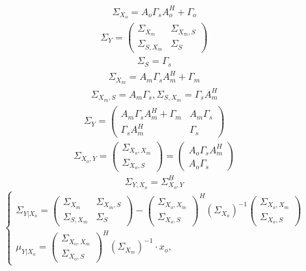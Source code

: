\documentclass[11pt]{article}
\begin{document}
\begin{gather}
\Sigma_{X_o}=A_o\Gamma_sA_o^H+\Gamma_o
\end{gather}
\begin{gather}
\Sigma_{Y} = \begin{pmatrix}
\Sigma_{X_m}&\Sigma_{X_m, S}\\
\Sigma_{S, X_m}&\Sigma_{S}
\end{pmatrix}
\end{gather}
\begin{gather}
\Sigma_{S} = \Gamma_s
\end{gather}
\begin{gather}
\Sigma_{X_m} = A_m \Gamma_s A_m^H + \Gamma_m
\end{gather}
\begin{gather}
\Sigma_{X_m,S} = A_m \Gamma_s, \Sigma_{S, X_m} = \Gamma_s A_m^H 
\end{gather}
\begin{gather}
\Sigma_{Y} = \begin{pmatrix}
A_m \Gamma_s A_m^H + \Gamma_m&A_m \Gamma_s\\
\Gamma_s A_m^H&\Gamma_s
\end{pmatrix}
\end{gather}
\begin{gather}
\Sigma_{X_o,Y}
= \begin{pmatrix}
\Sigma_{X_o,X_m}\\
\Sigma_{X_o,S}
\end{pmatrix}= 
\begin{pmatrix}
A_o\Gamma_s A_m^H\\
A_o\Gamma_s
\end{pmatrix}
\end{gather}
\begin{gather}
\Sigma_{Y,X_o}
= \Sigma_{X_o,Y}^H
\end{gather}
\begin{equation}
\left\{ \begin{gathered} 
\Sigma_{Y|X_o} = \begin{pmatrix}
\Sigma_{X_m}&\Sigma_{X_m, S}\\
\Sigma_{S, X_m}&\Sigma_{S}
\end{pmatrix}-\begin{pmatrix}
\Sigma_{X_o,X_m}\\
\Sigma_{X_o,S}
\end{pmatrix}^H(\Sigma_{X_o})^{-1}\begin{pmatrix}
\Sigma_{X_o,X_m}\\
\Sigma_{X_o,S}
\end{pmatrix} \\
\mu_{Y|X_o} =   \begin{pmatrix}
\Sigma_{X_o,X_m}\\
\Sigma_{X_o,S}
\end{pmatrix}^H(\Sigma_{X_m})^{-1}\cdot x_o,
\end{gathered} \right.
\end{equation}
\end{document}
